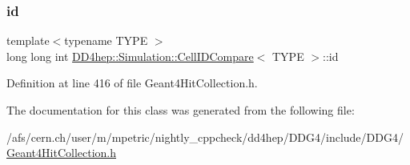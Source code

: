 \subsubsection{\texorpdfstring{id}{id}}
{\footnotesize\ttfamily template$<$typename T\+Y\+PE $>$ \\
long long int \hyperlink{class_d_d4hep_1_1_simulation_1_1_cell_i_d_compare}{D\+D4hep\+::\+Simulation\+::\+Cell\+I\+D\+Compare}$<$ T\+Y\+PE $>$\+::id}



Definition at line 416 of file Geant4\+Hit\+Collection.\+h.



The documentation for this class was generated from the following file\+:\begin{DoxyCompactItemize}
\item 
/afs/cern.\+ch/user/m/mpetric/nightly\+\_\+cppcheck/dd4hep/\+D\+D\+G4/include/\+D\+D\+G4/\hyperlink{_geant4_hit_collection_8h}{Geant4\+Hit\+Collection.\+h}\end{DoxyCompactItemize}
